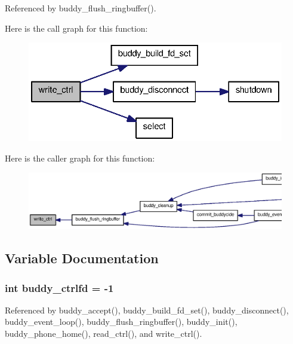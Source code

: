 Referenced by buddy\_\-flush\_\-ringbuffer().



Here is the call graph for this function:
\nopagebreak
\begin{figure}[H]
\begin{center}
\leavevmode
\includegraphics[width=330pt]{buddy_8c_a76b79c47442b30432c9f221b0b18c632_cgraph}
\end{center}
\end{figure}




Here is the caller graph for this function:\nopagebreak
\begin{figure}[H]
\begin{center}
\leavevmode
\includegraphics[width=400pt]{buddy_8c_a76b79c47442b30432c9f221b0b18c632_icgraph}
\end{center}
\end{figure}




\subsection{Variable Documentation}
\subsubsection[{buddy\_\-ctrlfd}]{\setlength{\rightskip}{0pt plus 5cm}int {\bf buddy\_\-ctrlfd} = -\/1\hspace{0.3cm}{\ttfamily  [static]}}\label{buddy_8c_a5d7cb1950bafb84d8b4d88b574640811}


Referenced by buddy\_\-accept(), buddy\_\-build\_\-fd\_\-set(), buddy\_\-disconnect(), buddy\_\-event\_\-loop(), buddy\_\-flush\_\-ringbuffer(), buddy\_\-init(), buddy\_\-phone\_\-home(), read\_\-ctrl(), and write\_\-ctrl().

